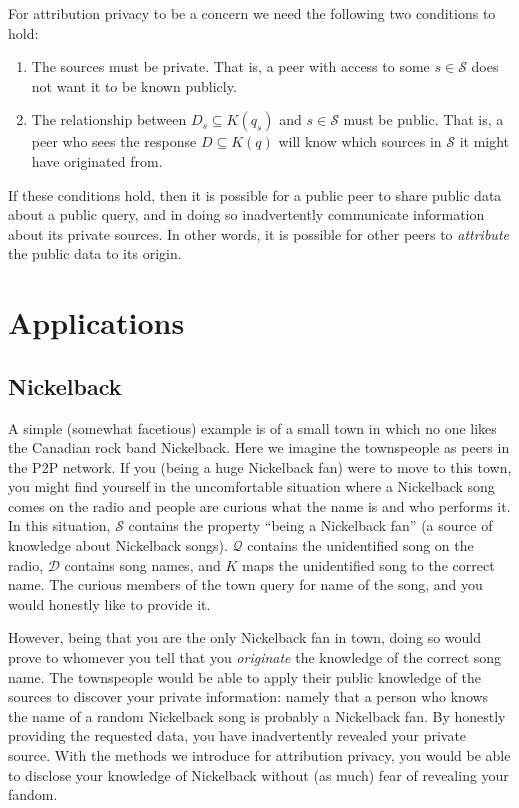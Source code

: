 \documentclass{article}
\begin{document}
For attribution privacy to be a concern we need the following two conditions to
hold:
\begin{enumerate}
	\item The sources must be private. That is, a peer with access to some
		$s\in\mathcal{S}$ does not want it to be known publicly.
	\item The relationship between $D_s\subseteq K(q_s)$ and $s\in\mathcal{S}$
		must be public. That is, a peer who sees the response $D\subseteq K(q)$
		will know which sources in $\mathcal{S}$ it might have originated from.
\end{enumerate}

If these conditions hold, then it is possible for a public peer to share public
data about a public query, and in doing so inadvertently communicate information
about its private sources. In other words, it is possible for other peers to
{\it attribute} the public data to its origin.

\section{Applications}\label{sec:example}

\subsection{Nickelback}\label{sec:nickelback}

A simple (somewhat facetious) example is of a small town in which no one likes
the Canadian rock band Nickelback. Here we imagine the townspeople as peers in
the P2P network. If you (being a huge Nickelback fan) were to move to this town,
you might find yourself in the uncomfortable situation where a Nickelback song
comes on the radio and people are curious what the name is and who performs it.
In this situation, $\mathcal{S}$ contains the property ``being a Nickelback
fan'' (a source of knowledge about Nickelback songs). $\mathcal{Q}$ contains the
unidentified song on the radio, $\mathcal{D}$ contains song names, and $K$ maps
the unidentified song to the correct name. The curious members of the town query
for name of the song, and you would honestly like to provide it.

However, being that you are the only Nickelback fan in town, doing so would
prove to whomever you tell that you {\it originate} the knowledge of the correct
song name. The townspeople would be able to apply their public knowledge of the
sources to discover your private information: namely that a person who knows the
name of a random Nickelback song is probably a Nickelback fan. By honestly
providing the requested data, you have inadvertently revealed your private
source. With the methods we introduce for attribution privacy, you would be able
to disclose your knowledge of Nickelback without (as much) fear of revealing
your fandom.
\end{document}
